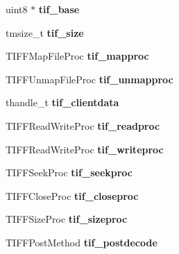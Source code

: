 \begin{DoxyCompactItemize}
\item 
\hypertarget{structtiff_a18c83f1c47838c58dc30d2779d4075ba}{}uint8 $\ast$ {\bfseries tif\+\_\+base}\label{structtiff_a18c83f1c47838c58dc30d2779d4075ba}

\item 
\hypertarget{structtiff_a44bdf3c0be90559aaea3c15bb1a8748b}{}tmsize\+\_\+t {\bfseries tif\+\_\+size}\label{structtiff_a44bdf3c0be90559aaea3c15bb1a8748b}

\item 
\hypertarget{structtiff_aecb824b0cad10891ce2d4278ba1c8cfc}{}T\+I\+F\+F\+Map\+File\+Proc {\bfseries tif\+\_\+mapproc}\label{structtiff_aecb824b0cad10891ce2d4278ba1c8cfc}

\item 
\hypertarget{structtiff_a9ba675f8409b09535ac5893b57f04567}{}T\+I\+F\+F\+Unmap\+File\+Proc {\bfseries tif\+\_\+unmapproc}\label{structtiff_a9ba675f8409b09535ac5893b57f04567}

\item 
\hypertarget{structtiff_a83ee52d41a4af6af8b6fd74d0330b12f}{}thandle\+\_\+t {\bfseries tif\+\_\+clientdata}\label{structtiff_a83ee52d41a4af6af8b6fd74d0330b12f}

\item 
\hypertarget{structtiff_acfe19caf31ae1c6bdbdb97404fa02606}{}T\+I\+F\+F\+Read\+Write\+Proc {\bfseries tif\+\_\+readproc}\label{structtiff_acfe19caf31ae1c6bdbdb97404fa02606}

\item 
\hypertarget{structtiff_acb4109f842cc509d8d5c95a57be5470f}{}T\+I\+F\+F\+Read\+Write\+Proc {\bfseries tif\+\_\+writeproc}\label{structtiff_acb4109f842cc509d8d5c95a57be5470f}

\item 
\hypertarget{structtiff_ac6466f0553a036c60b44d827ca34af03}{}T\+I\+F\+F\+Seek\+Proc {\bfseries tif\+\_\+seekproc}\label{structtiff_ac6466f0553a036c60b44d827ca34af03}

\item 
\hypertarget{structtiff_a66bb395b131b151563b274cf08d40f97}{}T\+I\+F\+F\+Close\+Proc {\bfseries tif\+\_\+closeproc}\label{structtiff_a66bb395b131b151563b274cf08d40f97}

\item 
\hypertarget{structtiff_abc89d9b5d0bfaf2cbc3b0df6567f947b}{}T\+I\+F\+F\+Size\+Proc {\bfseries tif\+\_\+sizeproc}\label{structtiff_abc89d9b5d0bfaf2cbc3b0df6567f947b}

\item 
\hypertarget{structtiff_a6a6ab14abe01b0d93d40c4fdb0992ae8}{}T\+I\+F\+F\+Post\+Method {\bfseries tif\+\_\+postdecode}\label{structtiff_a6a6ab14abe01b0d93d40c4fdb0992ae8}


\end{DoxyCompactItemize}

